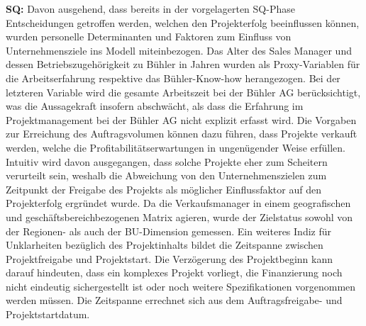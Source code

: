 \newline\newline\textbf{SQ:} Davon ausgehend, dass bereits in der vorgelagerten SQ-Phase Entscheidungen getroffen werden, welchen den Projekterfolg beeinflussen können, wurden personelle Determinanten und Faktoren zum Einfluss von Unternehmensziele ins Modell miteinbezogen. Das Alter des Sales Manager und dessen Betriebszugehörigkeit zu Bühler in Jahren wurden als Proxy-Variablen für die Arbeitserfahrung respektive das Bühler-Know-how herangezogen. Bei der letzteren Variable wird die gesamte Arbeitszeit bei der Bühler AG berücksichtigt, was die Aussagekraft insofern abschwächt, als dass die Erfahrung im Projektmanagement bei der Bühler AG nicht explizit erfasst wird. Die Vorgaben zur Erreichung des Auftragsvolumen können dazu führen, dass Projekte verkauft werden, welche die Profitabilitätserwartungen in ungenügender Weise erfüllen. Intuitiv wird davon ausgegangen, dass solche Projekte eher zum Scheitern verurteilt sein, weshalb die Abweichung von den Unternehmenszielen zum Zeitpunkt der Freigabe des Projekts als möglicher Einflussfaktor auf den Projekterfolg ergründet wurde. Da die Verkaufsmanager in einem geografischen und geschäftsbereichbezogenen Matrix agieren, wurde der Zielstatus sowohl von der Regionen- als auch der BU-Dimension gemessen. Ein weiteres Indiz für Unklarheiten bezüglich des Projektinhalts bildet die Zeitspanne zwischen Projektfreigabe und Projektstart. Die Verzögerung des Projektbeginn kann darauf hindeuten, dass ein komplexes Projekt vorliegt, die Finanzierung noch nicht eindeutig sichergestellt ist oder noch weitere Spezifikationen vorgenommen werden müssen. Die Zeitspanne errechnet sich aus dem Auftragsfreigabe- und Projektstartdatum.
